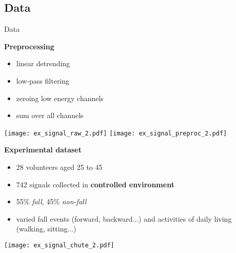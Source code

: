 \subsection{Data}

\begin{frame}{Data}


\vspace{0.5cm}

\begin{minipage}[t]{0.49\linewidth}
    \vspace{0pt}
        \textbf{Preprocessing}
        \begin{itemize}
            \item linear detrending
            \item low-pass filtering
            \item zeroing low energy channels
            \item sum over all channels
        \end{itemize}
    \vspace{0.5cm}
    \begin{overprint}
            \texttt{[image: ex\_signal\_raw\_2.pdf]}
            \texttt{[image: ex\_signal\_preproc\_2.pdf]}
    \end{overprint}
\end{minipage}\hfill
\begin{minipage}[t]{0.49\linewidth}
\vspace{0pt}
    \pause \pause
    \textbf{Experimental dataset}
    \begin{itemize}
        \item 28 volunteers aged 25 to 45
        \item 742 signals collected in \textbf{controlled environment}
        \item 55\% \emph{fall}, 45\% \emph{non-fall}
        \item varied fall events (forward, backward...) and activities of daily living (walking, sitting...)
    \end{itemize}
    \smallskip
    \centering
    \vspace{0.3cm}
    \texttt{[image: ex\_signal\_chute\_2.pdf]}

\end{minipage}

\end{frame}

